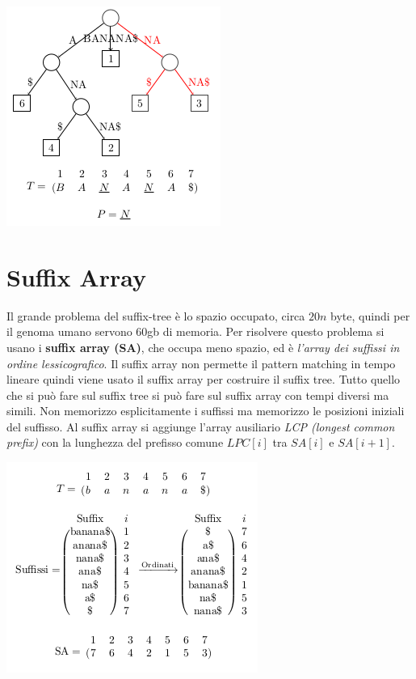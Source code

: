 \documentclass[a4paper,12pt, oneside]{book}
\begin{document}
\begin{center}
  \includegraphics[scale = 0.7]{img/su.png}
\end{center}
\section{Suffix Array}
Il grande problema del suffix-tree è lo spazio occupato, circa $20n$
byte, quindi per il genoma umano servono 60gb di memoria. Per
risolvere questo problema si usano i \textbf{suffix array (SA)}, che occupa
meno spazio, ed è \textit{l'array dei suffissi in ordine
  lessicografico}. Il suffix array non permette il pattern matching in
tempo lineare quindi viene usato il suffix array per costruire il
suffix tree. Tutto quello che si può fare sul suffix tree si può fare
sul suffix array con tempi diversi ma simili. Non memorizzo
esplicitamente i suffissi ma memorizzo le posizioni iniziali del
suffisso. Al suffix array si aggiunge l'array ausiliario \textit{LCP
  (longest common prefix)} con la lunghezza del prefisso comune $LPC[i]$
tra $SA[i]$ e $SA[i+1]$.
\begin{center}
  \includegraphics[scale = 0.7]{img/sa.png}
\end{center}
\end{document}
